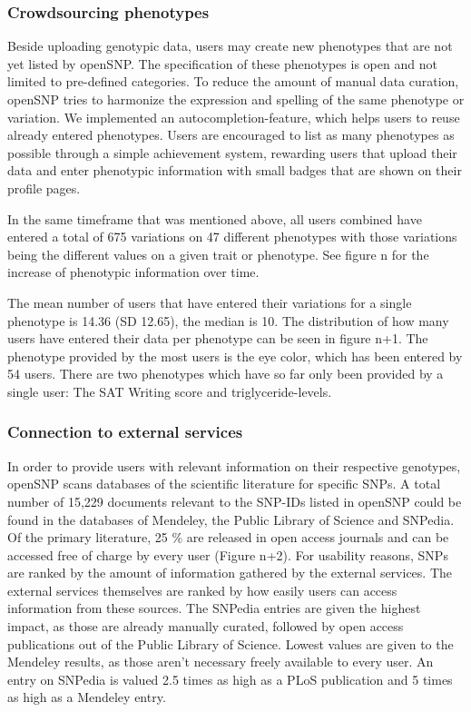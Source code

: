 \documentclass[10pt]{article}
\begin{document}
\subsubsection*{Crowdsourcing phenotypes}
Beside uploading genotypic data, users may create new phenotypes that are not yet 
listed by openSNP. 
The specification of these phenotypes is open and not limited 
to pre-defined categories. To reduce the amount of manual data curation, openSNP tries to harmonize 
the expression and spelling of the same phenotype or variation. We implemented an 
autocompletion-feature, which helps users to reuse already entered phenotypes.
Users are encouraged to list as many phenotypes as possible through a simple 
achievement system, rewarding users that upload their data and enter phenotypic 
information with small badges that are shown on their profile pages.

In the same timeframe that was mentioned above, all users combined have 
entered a total of 675 variations on 47 different phenotypes with those variations being 
the different values on a given trait or phenotype. See figure n for the increase of phenotypic information over time.

The mean number of users that have entered their variations for a single phenotype 
is 14.36 (SD 12.65), the median is 10. The distribution of how many users have 
entered their data per phenotype can be seen in figure n+1. The phenotype provided 
by the most users is the eye color, which has been entered by 54 users. There are 
two phenotypes which have so far only been provided by a single user: 
The SAT Writing score and triglyceride-levels.


\subsubsection*{Connection to external services}
In order to provide users with relevant information on their respective genotypes, openSNP scans databases of the scientific literature for specific SNPs. 
A total number of 15,229 documents relevant to the SNP-IDs listed in openSNP could be found in the databases of Mendeley, the Public Library of Science and SNPedia. 
Of the primary literature, 25 \% are released in open access journals and can be accessed free of charge by every user (Figure n+2). For usability reasons, 
SNPs are ranked by the amount of information gathered by the external services. The external services themselves are ranked by how easily users can access information 
from these sources. The SNPedia entries are given the highest impact, as those are already manually curated, followed by open access publications out of 
the Public Library of Science. Lowest values are given to the Mendeley results, as those aren't necessary freely available to every user. 
An entry on SNPedia is valued 2.5 times as high as a PLoS publication and 5 times as high as a Mendeley entry.  
\end{document}
